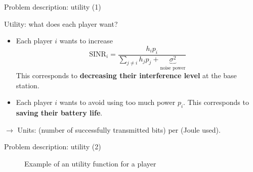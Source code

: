 \begin{frame}{Problem description: utility (1)}
    \begin{exampleblock}{Utility: what does each player want?}
        \begin{itemize}
            \pause
            \item Each player $i$ wants to increase
            \[ \text{SINR}_i = \frac{h_ip_i}{\sum_{j\neq i} h_jp_j 
                + \underbrace{\sigma^2}_\text{noise power}} \]
            This corresponds to \textbf{decreasing their interference level} at the base station.
            \pause
            \item Each player $i$ wants to avoid using too much power $p_i$. This corresponds
            to \textbf{saving their battery life}.
        \end{itemize}
    \end{exampleblock}

    \pause
    \vspace{0.5cm}
    $\to$ Units: (number of successfully transmitted bits) per (Joule used).
\end{frame}

\begin{frame}{Problem description: utility (2)}
    \begin{figure}
        \centering
        \caption{Example of an utility function for a player}
    \end{figure}
\end{frame}


